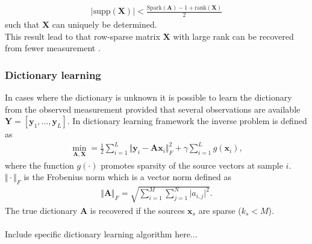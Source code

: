 \begin{align*}
\vert \text{supp}(\mathbf{X}) \vert < \frac{\text{Spark} (\mathbf{A}) - 1 + \text{rank}(\mathbf{X})}{2}
\end{align*}
such that $\mathbf{X}$ can uniquely be determined.
\\
This result lead to that row-sparse matrix $\mathbf{X}$ with large rank can be recovered from fewer measurement \cite[p. 43]{CS}.


\subsubsection{Dictionary learning}\label{sec:dictionarylearning}
In cases where the dictionary is unknown it is possible to learn the dictionary from the observed measurement provided that several observations are available $\textbf{Y}=\left[ \textbf{y}_1, \dots ,\textbf{y}_L \right]$. 
In dictionary learning framework the inverse problem is defined as
\begin{align*}
\min_{\mathbf{A,X}} = \frac{1}{2} \sum_{i=1}^{L} \Vert \mathbf{y} _i - \mathbf{Ax}_i \Vert_F^2 + \gamma \sum_{i=1}^{L} g(\mathbf{x}_i),
\end{align*}
where the function $g(\cdot)$ promotes sparsity of the source vectors at sample $i$. $\Vert \cdot \Vert_F$ is the Frobenius norm which is a vector norm defined as 
\begin{align*}
\Vert \mathbf{A} \Vert_F = \sqrt{\sum_{i=1}^M \sum_{j=1}^N \vert a_{i,j} \vert^2}.
\end{align*}
The true dictionary $\mathbf{A}$ is recovered if the sources $\mathbf{x}_s$ are sparse ($k_s < M$).
\\  \\
Include specific dictionary learning algorithm here...

